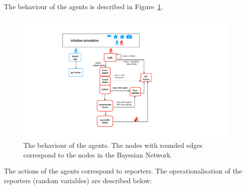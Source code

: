 The behaviour of the agents is described in Figure~\ref{behaviour}. 

\begin{figure}[htbp]
\begin{center}
\includegraphics[width=\linewidth]{images/spatialsimpleAgent.pdf}
\end{center}
\caption{The behaviour of the agents. The nodes with rounded edges correspond to the nodes in the Bayesian Network.}
\label{behaviour}
\end{figure}

The actions of the agents correspond to reporters. The operationalisation of the reporters (random variables) are described below:

